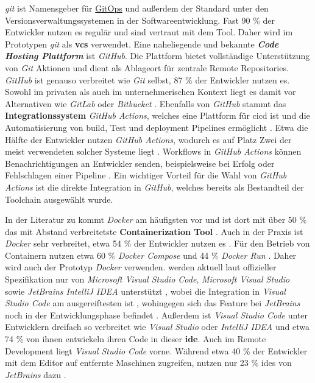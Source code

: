 \textit{\Gls{git}} ist Namensgeber für \hyperref[sec:03-03_gitops]{GitOps} und außerdem der Standard unter den Versionsverwaltungssystemen in der Softwareentwicklung. Fast 90 \% der Entwickler nutzen es regulär \cite{207:Developer-Ecosystem} und sind vertraut mit dem Tool. Daher wird im Prototypen \textit{\Gls{git}} als \textbf{\Gls{vcs}} verwendet. Eine naheliegende und bekannte \textbf{\textit{Code Hosting Plattform}} ist \textit{GitHub}. Die Plattform bietet vollständige Unterstützung von \textit{Git} Aktionen und dient als Ablageort für zentrale Remote Repositories. \cite{301:About-GitHub-and-Git} \textit{GitHub} ist genauso verbreitet wie \textit{Git} selbst, 87 \% der Entwickler nutzen es. Sowohl im privaten als auch im unternehmerischen Kontext liegt es damit vor Alternativen wie \textit{GitLab} oder \textit{Bitbucket} \cite{207:Developer-Ecosystem}. Ebenfalls von \textit{GitHub} stammt das \textbf{Integrationssystem} \textit{GitHub Actions}, welches eine Plattform für \Gls{cicd} ist und die Automatisierung von \Gls{build}, Test und \Gls{deployment} Pipelines ermöglicht \cite{302:Understanding-GitHub-Actions}. Etwa die Hälfte der Entwickler nutzen \textit{GitHub Actions}, wodurch es auf Platz Zwei der meist verwendeten solcher Systeme liegt \cite{207:Developer-Ecosystem}. Workflows in \textit{GitHub Actions} können Benachrichtigungen an Entwickler senden, beispielsweise bei Erfolg oder Fehlschlagen einer Pipeline \cite{307:Notifications-for-Workflow-Runs}. Ein wichtiger Vorteil für die Wahl von \textit{GitHub Actions} ist die direkte Integration in \textit{GitHub}, welches bereits als Bestandteil der Toolchain ausgewählt wurde.

In der Literatur zu  kommt \textit{Docker} am häufigsten vor und ist dort mit über 50 \% das mit Abstand verbreitetste \textbf{Containerization Tool} \cite{015:Containers-in-Software-Development}. Auch in der Praxis ist \textit{Docker} sehr verbreitet, etwa 54 \% der Entwickler nutzen es \cite{206:Developer-Survey-2024,207:Developer-Ecosystem}. Für den Betrieb von Containern nutzen etwa 60 \% \textit{Docker Compose} und 44 \% \textit{Docker Run} \cite{207:Developer-Ecosystem}. Daher wird auch der Prototyp \textit{Docker} verwenden.  werden aktuell laut offizieller Spezifikation nur von \textit{Microsoft Visual Studio Code}, \textit{Microsoft Visual Studio} sowie \textit{JetBrains IntelliJ IDEA} unterstützt \cite{306:Development-Containers}, wobei die Integration in \textit{Visual Studio Code} am ausgereiftesten ist \cite{204:Development-Containers-Simplified}, wohingegen sich das Feature bei \textit{JetBrains} noch in der Entwicklungsphase befindet \cite{306:Development-Containers}. Außerdem ist \textit{Visual Studio Code} unter Entwicklern dreifach so verbreitet wie \textit{Visual Studio} oder \textit{IntelliJ IDEA} und etwa 74 \% von ihnen entwickeln ihren Code in dieser \textbf{\Gls{ide}}. Auch im Remote Development liegt \textit{Visual Studio Code} vorne. Während etwa 40 \% der Entwickler mit dem Editor auf entfernte Maschinen zugreifen, nutzen nur 23 \% \Glspl{ide} von \textit{JetBrains} dazu \cite{207:Developer-Ecosystem}.

